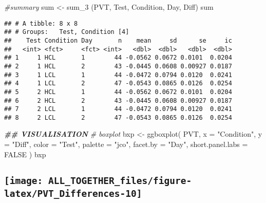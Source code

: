 \documentclass[
]{article}
\newenvironment{Shaded}{\begin{snugshade}}{\end{snugshade}}
\newcommand{\AttributeTok}[1]{\textcolor[rgb]{0.77,0.63,0.00}{#1}}
\newcommand{\CommentTok}[1]{\textcolor[rgb]{0.56,0.35,0.01}{\textit{#1}}}
\newcommand{\ConstantTok}[1]{\textcolor[rgb]{0.00,0.00,0.00}{#1}}
\newcommand{\DocumentationTok}[1]{\textcolor[rgb]{0.56,0.35,0.01}{\textbf{\textit{#1}}}}
\newcommand{\FunctionTok}[1]{\textcolor[rgb]{0.00,0.00,0.00}{#1}}
\newcommand{\NormalTok}[1]{#1}
\newcommand{\OtherTok}[1]{\textcolor[rgb]{0.56,0.35,0.01}{#1}}
\newcommand{\StringTok}[1]{\textcolor[rgb]{0.31,0.60,0.02}{#1}}
\begin{document}
\begin{Shaded}
\begin{Highlighting}[]
\CommentTok{\#summary}
\NormalTok{sum }\OtherTok{\textless{}{-}} \FunctionTok{sum\_3}\NormalTok{ (PVT, }\StringTok{\textquotesingle{}Test\textquotesingle{}}\NormalTok{, }\StringTok{\textquotesingle{}Condition\textquotesingle{}}\NormalTok{, }\StringTok{\textquotesingle{}Day\textquotesingle{}}\NormalTok{, }\StringTok{\textquotesingle{}Diff\textquotesingle{}}\NormalTok{)}
\NormalTok{sum}
\end{Highlighting}
\end{Shaded}

\begin{verbatim}
## # A tibble: 8 x 8
## # Groups:   Test, Condition [4]
##    Test Condition Day       n    mean     sd      se     ic
##   <int> <fct>     <fct> <int>   <dbl>  <dbl>   <dbl>  <dbl>
## 1     1 HCL       1        44 -0.0562 0.0672 0.0101  0.0204
## 2     1 HCL       2        43 -0.0445 0.0608 0.00927 0.0187
## 3     1 LCL       1        44 -0.0472 0.0794 0.0120  0.0241
## 4     1 LCL       2        47 -0.0543 0.0865 0.0126  0.0254
## 5     2 HCL       1        44 -0.0562 0.0672 0.0101  0.0204
## 6     2 HCL       2        43 -0.0445 0.0608 0.00927 0.0187
## 7     2 LCL       1        44 -0.0472 0.0794 0.0120  0.0241
## 8     2 LCL       2        47 -0.0543 0.0865 0.0126  0.0254
\end{verbatim}

\begin{Shaded}
\begin{Highlighting}[]
\DocumentationTok{\#\# VISUALISATION}
\CommentTok{\# boxplot}
\NormalTok{bxp }\OtherTok{\textless{}{-}} \FunctionTok{ggboxplot}\NormalTok{(}
\NormalTok{  PVT, }\AttributeTok{x =} \StringTok{"Condition"}\NormalTok{, }\AttributeTok{y =} \StringTok{"Diff"}\NormalTok{,}
  \AttributeTok{color =} \StringTok{"Test"}\NormalTok{, }\AttributeTok{palette =} \StringTok{"jco"}\NormalTok{,}
  \AttributeTok{facet.by =} \StringTok{"Day"}\NormalTok{, }\AttributeTok{short.panel.labs =} \ConstantTok{FALSE}
\NormalTok{  )}
\NormalTok{bxp}
\end{Highlighting}
\end{Shaded}

\hypertarget{section}{%
\subsection{\texorpdfstring{\texttt{[image: ALL\_TOGETHER\_files/figure-latex/PVT\_Differences-10]}}{}}\label{section}}
\end{document}
